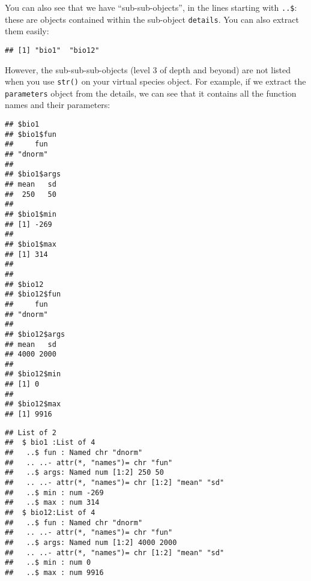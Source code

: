 \documentclass[]{article}
\newenvironment{Shaded}{\begin{snugshade}}{\end{snugshade}}
\newcommand{\KeywordTok}[1]{\textcolor[rgb]{0.13,0.29,0.53}{\textbf{#1}}}
\newcommand{\CommentTok}[1]{\textcolor[rgb]{0.56,0.35,0.01}{\textit{#1}}}
\newcommand{\OperatorTok}[1]{\textcolor[rgb]{0.81,0.36,0.00}{\textbf{#1}}}
\newcommand{\NormalTok}[1]{#1}
\begin{document}
You can also see that we have ``sub-sub-objects'', in the lines starting
with \texttt{..\$}: these are objects contained within the sub-object
\texttt{details}. You can also extract them easily:

\begin{Shaded}
\end{Shaded}

\begin{verbatim}
## [1] "bio1"  "bio12"
\end{verbatim}

However, the sub-sub-sub-objects (level 3 of depth and beyond) are not
listed when you use \texttt{str()} on your virtual species object. For
example, if we extract the \texttt{parameters} object from the details,
we can see that it contains all the function names and their parameters:

\begin{Shaded}
\end{Shaded}

\begin{verbatim}
## $bio1
## $bio1$fun
##     fun 
## "dnorm" 
## 
## $bio1$args
## mean   sd 
##  250   50 
## 
## $bio1$min
## [1] -269
## 
## $bio1$max
## [1] 314
## 
## 
## $bio12
## $bio12$fun
##     fun 
## "dnorm" 
## 
## $bio12$args
## mean   sd 
## 4000 2000 
## 
## $bio12$min
## [1] 0
## 
## $bio12$max
## [1] 9916
\end{verbatim}

\begin{Shaded}
\end{Shaded}

\begin{verbatim}
## List of 2
##  $ bio1 :List of 4
##   ..$ fun : Named chr "dnorm"
##   .. ..- attr(*, "names")= chr "fun"
##   ..$ args: Named num [1:2] 250 50
##   .. ..- attr(*, "names")= chr [1:2] "mean" "sd"
##   ..$ min : num -269
##   ..$ max : num 314
##  $ bio12:List of 4
##   ..$ fun : Named chr "dnorm"
##   .. ..- attr(*, "names")= chr "fun"
##   ..$ args: Named num [1:2] 4000 2000
##   .. ..- attr(*, "names")= chr [1:2] "mean" "sd"
##   ..$ min : num 0
##   ..$ max : num 9916
\end{verbatim}
\end{document}
